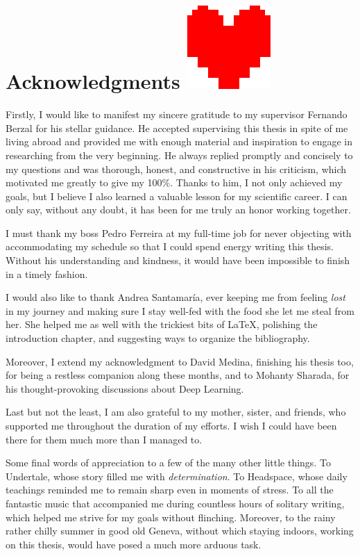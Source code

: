 
\chapter*{Acknowledgments \includegraphics[scale=0.1]{gfx/determination}}
\vspace*{-10mm}

Firstly, I would like to manifest my sincere gratitude to my supervisor Fernando Berzal for his stellar guidance.
He accepted supervising this thesis in spite of me living abroad and provided me with enough material and inspiration to engage in researching from the very beginning.
He always replied promptly and concisely to my questions and was thorough, honest, and constructive in his criticism, which motivated me greatly to give my 100\%.
Thanks to him, I not only achieved my goals, but I believe I also learned a valuable lesson for my scientific career.
I can only say, without any doubt, it has been for me truly an honor working together.

I must thank my boss Pedro Ferreira at my full-time job for never objecting with accommodating my schedule so that I could spend energy writing this thesis.
Without his understanding and kindness, it would have been impossible to finish in a timely fashion.

I would also like to thank Andrea Santamaría, ever keeping me from feeling \emph{lost} in my journey and making sure I stay well-fed with the food she let me steal from her.
She helped me as well with the trickiest bits of \LaTeX, polishing the introduction chapter, and suggesting ways to organize the bibliography.

Moreover, I extend my acknowledgment to David Medina, finishing his thesis too, for being a restless companion along these months, and to Mohanty Sharada, for his thought-provoking discussions about Deep Learning.

Last but not the least, I am also grateful to my mother, sister, and friends, who supported me throughout the duration of my efforts.
I wish I could have been there for them much more than I managed to.

Some final words of appreciation to a few of the many other little things.
To Undertale, whose story filled me with \emph{determination}.
To Headspace, whose daily teachings reminded me to remain sharp even in moments of stress.
To all the fantastic music that accompanied me during countless hours of solitary writing, which helped me strive for my goals without flinching.
Moreover, to the rainy rather chilly summer in good old Geneva, without which staying indoors, working on this thesis, would have posed a much more arduous task.
